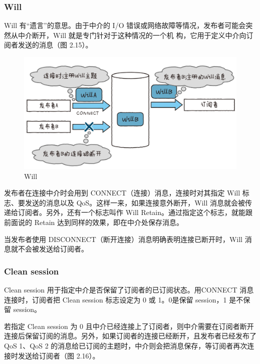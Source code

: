 \documentclass[12pt,UTF8]{ctexbook}
\begin{document}
\subsubsection{Will}

Will 有“遗言”的意思。由于中介的 I/O 错误或网络故障等情况，发布者可能会突然从中介断开，Will 就是专门针对于这种情况的一个机
构，它用于定义中介向订阅者发送的消息（图 2.15）。

\begin{figure}[htbp]
	\centering
	\includegraphics[width=1\linewidth]{34}
	\caption{Will}
	\label{fig:1}
\end{figure}

发布者在连接中介时会用到 CONNECT（连接）消息，连接时对其指定 Will 标志、要发送的消息以及 QoS。这样一来，如果连接意外断开，Will 消息就会被传递给订阅者。另外，还有一个标志叫作 Will
Retain。通过指定这个标志，就能跟前面说的 Retain 达到同样的效果，即在中介处保存消息。

当发布者使用 DISCONNECT（断开连接）消息明确表明连接已断开时，Will 消息就不会被发送给订阅者。

\subsubsection{Clean session}

Clean session 用于指定中介是否保留了订阅者的已订阅状态。用CONNECT 消息连接时，订阅者把 Clean session 标志设定为 0 或 1。0是保留 session，1 是不保留 session。

若指定 Clean session 为 0 且中介已经连接上了订阅者，则中介需要在订阅者断开连接后保留订阅的消息。另外，如果订阅者的连接已经断开，且发布者已经发布了 QoS 1、QoS 2 的消息给已订阅的主题时，中介则会把消息保存，等订阅者再次连接时发送给订阅者（图 2.16）。
\end{document}
